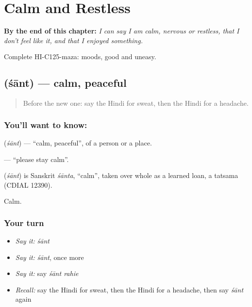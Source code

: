 
\chapter{Calm and Restless}
\label{ch:hi-calm-and-restless}

\begin{chapteropening}
\textbf{By the end of this chapter:} \emph{I can say I am calm, nervous or restless, that I don't feel like it, and that I enjoyed something.}

Complete HI-C125-maza: moods, good and uneasy.
\end{chapteropening}

\section[\texorpdfstring{\hi{शांत} (śānt)}{शांत (śānt)}]{ (śānt) — calm, peaceful}

\label{lesson:HI-C125-shant}



\begin{quote}
Before the new one: say the Hindi for sweat, then the Hindi for a headache.
\end{quote}

\subsection*{You'll want to know: }
\textbf{} (\emph{śānt}) — \textquotedblleft{}calm, peaceful\textquotedblright{}, of a person or a place.

\textbf{ } — \textquotedblleft{}please stay calm\textquotedblright{}.

\begin{cousinweb}
\textbf{} (\emph{śānt}) is Sanskrit \emph{śānta}, \textquotedblleft{}calm\textquotedblright{}, taken over whole as a learned loan, a tatsama (CDIAL 12390).
\end{cousinweb}

\begin{grammarlens}[title={What you've built}]
Calm.
\end{grammarlens}

\subsection*{Your turn}
\begin{itemize}
\raggedright
  \item \emph{Say it:} \emph{śānt}
  \item \emph{Say it:} \emph{śānt}, once more
  \item \emph{Say it:} say \emph{śānt rahie}
  \item \emph{Recall:} say the Hindi for sweat, then the Hindi for a headache, then say \emph{śānt} again
\end{itemize}

